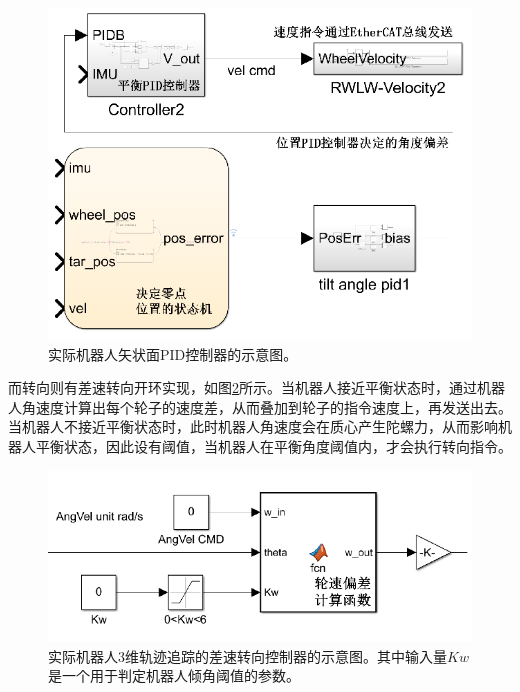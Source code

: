 \begin{figure}[h!]
  \centering
  \includegraphics[width=0.75\linewidth]{figures/Sec4/2dpid.png}
  \caption{
  实际机器人矢状面PID控制器的示意图。
  }
  \label{fig:sec4-2dpid}
   \vspace{6pt}
\end{figure}

而转向则有差速转向开环实现，如图\ref{fig:sec4-3dpid}所示。当机器人接近平衡状态时，通过机器人角速度计算出每个轮子的速度差，从而叠加到轮子的指令速度上，再发送出去。当机器人不接近平衡状态时，此时机器人角速度会在质心产生陀螺力，从而影响机器人平衡状态，因此设有阈值，当机器人在平衡角度阈值内，才会执行转向指令。

\begin{figure}
  \centering
  \includegraphics[width=0.8\linewidth]{figures/Sec4/3dpid.png}
  \caption{
  实际机器人3维轨迹追踪的差速转向控制器的示意图。其中输入量$Kw$是一个用于判定机器人倾角阈值的参数。
  }
  \label{fig:sec4-3dpid}
   \vspace{6pt}
\end{figure}

